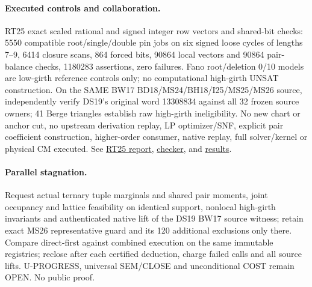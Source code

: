 \documentclass[11pt]{article}
\begin{document}
\paragraph{Executed controls and collaboration.}
RT25 exact scaled rational and signed integer row vectors and shared-bit checks: 5550 compatible root/single/double pin jobs on six signed loose cycles of lengths 7--9, 6414 closure scans, 864 forced bits, 90864 local vectors and 90864 pair-balance checks, 1180283 assertions, zero failures. Fano root/deletion 0/10 models are low-girth reference controls only; no computational high-girth UNSAT construction. On the SAME BW17 BD18/MS24/BH18/I25/MS25/MS26 source, independently verify DS19's original word 13308834 against all 32 frozen source owners; 41 Berge triangles establish raw high-girth ineligibility. No new chart or anchor cut, no upstream derivation replay, LP optimizer/SNF, explicit pair coefficient construction, higher-order consumer, native replay, full solver/kernel or physical CM executed. See \href{https://github.com/j15marti/pnp/commit/b4e4926ff477a1b64ed35a661a855a25bc4d14b4}{RT25 report}, \href{https://github.com/j15marti/pnp/commit/ffb31faa56a46c71611c0eda490b1309863401ad}{checker}, and \href{https://github.com/j15marti/pnp/commit/6f99299ad31b0f0dd117e5d009923418f366c212}{results}.
\paragraph{Parallel stagnation.}
Request actual ternary tuple marginals and shared pair moments, joint occupancy and lattice feasibility on identical support, nonlocal high-girth invariants and authenticated native lift of the DS19 BW17 source witness; retain exact MS26 representative guard and its 120 additional exclusions only there. Compare direct-first against combined execution on the same immutable registries; reclose after each certified deduction, charge failed calls and all source lifts. U-PROGRESS, universal SEM/CLOSE and unconditional COST remain OPEN. No public proof.
\end{document}
